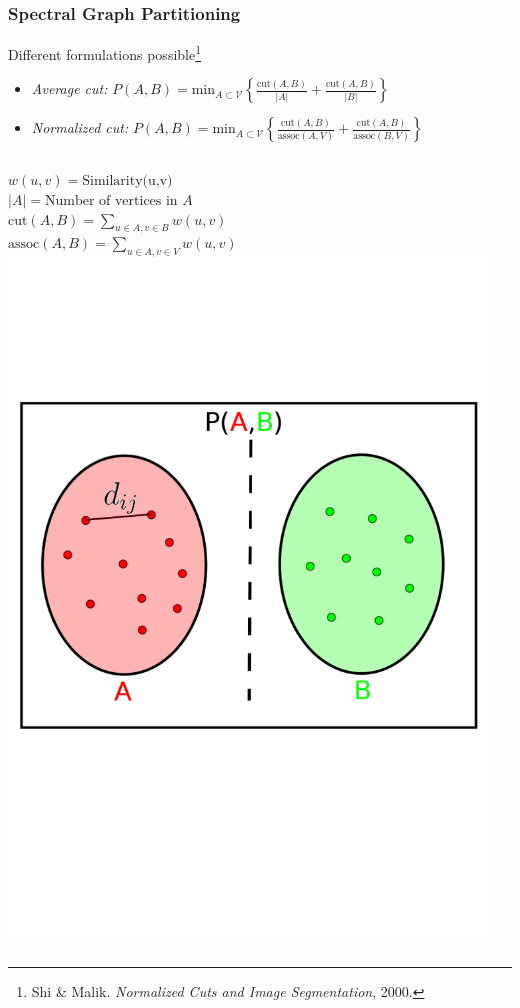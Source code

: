 \documentclass[9pt]{beamer}
\begin{document}
\begin{frame}
\frametitle{Spectral Graph Partitioning}
\label{sec-2-2}

Different formulations possible\footnote{Shi \& Malik. \emph{Normalized Cuts and Image Segmentation}, 2000.
 }
\begin{itemize}
\item \emph{Average cut:} $P(A,B) = \text{min}_{A \subset \mathcal{V}} \left \lbrace \frac{\text{cut}(A,B)}{| A |} + \frac{\text{cut}(A,B)}{| B |} \right \rbrace$
\item \emph{Normalized cut:} $P(A,B) = \text{min}_{A \subset \mathcal{V}} \left \lbrace \frac{\text{cut}(A,B)}{\text{assoc}(A,V)} + \frac{\text{cut}(A,B)}{\text{assoc}(B,V)} \right \rbrace$
\end{itemize}
\vspace{-1.0cm}
\begin{columns}[c]
    $w(u,v) = \text{Similarity(u,v)}$ \\
    $|A| = \text{Number of vertices in }A$ \\
    $\text{cut}(A,B) = \sum_{u \in A,v \in B} w(u,v)$ \\ 
    $\text{assoc}(A,B) = \sum_{u \in A, v \in V} w(u,v)$
    \centering
    \includegraphics[width=0.95\textwidth]{GraphPartition.png}
\end{columns}
\vspace{-1.0cm}
\end{frame}
\end{document}
